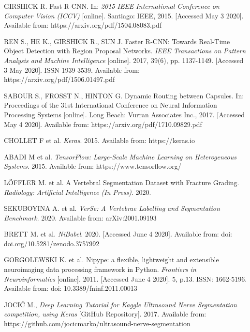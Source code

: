 \begin{thebibliography}{9}
GIRSHICK R. Fast R-CNN. In: \textit{2015 IEEE International Conference on Computer Vision (ICCV)} [online]. Santiago: IEEE, 2015. [Accessed May 3 2020]. Available from: https://arxiv.org/pdf/1504.08083.pdf

REN S., HE K., GIRSHICK R., SUN J. Faster R-CNN: Towards Real-Time Object Detection with Region Proposal Networks. \textit{IEEE Transactions on Pattern Analysis and Machine Intelligence} [online]. 2017, 39(6), pp. 1137-1149. [Accessed 3 May 2020]. ISSN 1939-3539. Available from: https://arxiv.org/pdf/1506.01497.pdf

SABOUR S., FROSST N., HINTON G. Dynamic Routing between Capsules. In: {Proceedings of the 31st International Conference on Neural Information Processing Systems} [online]. Long Beach: Vurran Associates Inc., 2017. [Accessed May 4 2020]. Available from: https://arxiv.org/pdf/1710.09829.pdf

CHOLLET F et al. \textit{Keras}. 2015. Available from: https://keras.io

ABADI M et al. \textit{TensorFlow: Large-Scale Machine Learning on Heterogeneous Systems}. 2015. Available from: https://www.tensorflow.org/

LÖFFLER M. et al. A Vertebral Segmentation Dataset with Fracture Grading. \textit{Radiology: Artificial Intelligence (In Press)}. 2020.

SEKUBOYINA A. et al. \textit{VerSe: A Vertebrae Labelling and Segmentation Benchmark}. 2020. Available from: arXiv:2001.09193

BRETT M. et al. \textit{NiBabel}. 2020. [Accessed June 4 2020]. Available from: doi: doi.org/10.5281/zenodo.3757992

GORGOLEWSKI K. et al. Nipype: a flexible, lightweight and extensible neuroimaging data processing framework in Python. \textit{Frontiers in Neuroinformatics} [online]. 2011. [Accessed June 4 2020]. 5, p.13. ISSN: 1662-5196. Available from: doi: 10.3389/fninf.2011.00013   

JOCIĆ M., \textit{Deep Learning Tutorial for Kaggle Ultrasound Nerve Segmentation competition, using Keras} [GitHub Repository]. 2017. Available from: https://github.com/jocicmarko/ultrasound-nerve-segmentation

\end{thebibliography}